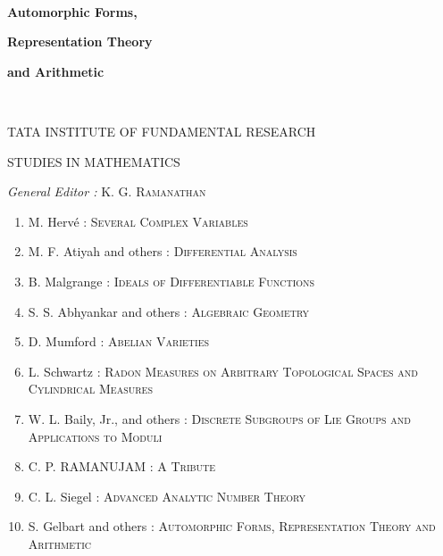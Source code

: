~\vfill

\begin{center}
{\Large\bf Automorphic Forms,}

{\Large\bf Representation Theory}

{\Large\bf and Arithmetic}
\medskip

\thispagestyle{empty}
\end{center}

\vfill\eject

~\phantom{a}
\thispagestyle{empty}

\begin{center}
TATA INSTITUTE OF FUNDAMENTAL RESEARCH

STUDIES IN MATHEMATICS

\bigskip
{\em General Editor :} K. G. \textsc{Ramanathan}
\end{center}

\begin{enumerate}
\item M. Herv\'e : \textsc{\small Several  Complex  Variables} 

\item M. F. Atiyah and others : \textsc{\small Differential  Analysis}

\item B. Malgrange : \textsc{\small Ideals of  Differentiable  Functions}

\item S. S. Abhyankar and others : \textsc{\small Algebraic  Geometry}

\item D. Mumford : \textsc{\small Abelian Varieties}

\item L. Schwartz : \textsc{\small Radon Measures on Arbitrary Topological Spaces and Cylindrical Measures}

\item W. L. Baily, Jr., and others : \textsc{\small Discrete Subgroups of Lie Groups and Applications to Moduli}

\item C. P. RAMANUJAM : \textsc{\small A Tribute}

\item C. L. Siegel : \textsc{\small Advanced Analytic Number Theory}

\item S. Gelbart and others : \textsc{\small Automorphic Forms, Representation Theory and Arithmetic}
\end{enumerate}

